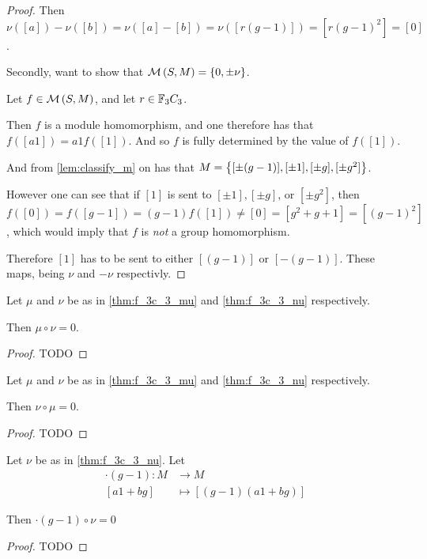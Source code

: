\begin{proof}
    Then \( \nu([a]) - \nu([b]) = \nu([a] - [b]) = \nu([r(g - 1)]) = [r(g - 1)^2] = [0] \).

    Secondly, want to show that \( {\mathcal{M}}\left( S, M \right) = \left\{ 0, \pm \nu \right\} \).

    Let \( f \in {\mathcal{M}}\left( S, M \right) \), and let \( r \in {\mathbb{F}}_3C_3 \).
    
    Then \( f \) is a module homomorphism, and one therefore has that \( f([a1]) = a1 f([1]) \). And so \( f \) is fully determined by the value of \( f([1]) \). 
    
    And from \autoref{lem:classify_m} on has that \( M = \left\{ [\pm (g - 1)], [\pm 1], [\pm g], [\pm g^2] \right\} \).

    However one can see that if \( [1] \) is sent to \( [\pm 1], [\pm g] \), or \( [\pm g^2] \), then \( f([0]) = f([g - 1]) = (g - 1)f([1]) \neq [0] = [g^2 + g + 1] = [(g - 1)^2] \), which would imply that \( f \) is \emph{not} a group homomorphism.

    Therefore \( [1] \) has to be sent to either \( [(g - 1)] \) or \( [-(g - 1)] \). These maps, being \( \nu \) and \( -\nu \) respectivly.
\end{proof}

\begin{lemma} \label{thm:f_3c_3_mu_circ_nu_zero}
    Let \( \mu \) and \( \nu \) be as in \autoref{thm:f_3c_3_mu} and \autoref{thm:f_3c_3_nu} respectively.

    Then \( \mu \circ \nu = 0 \).
\end{lemma}
\begin{proof}
    TODO
\end{proof}

\begin{lemma} \label{thm:f_3c_3_nu_circ_mu_zero}
    Let \( \mu \) and \( \nu \) be as in \autoref{thm:f_3c_3_mu} and \autoref{thm:f_3c_3_nu} respectively.

    Then \( \nu \circ \mu = 0 \).
\end{lemma}
\begin{proof}
    TODO
\end{proof}

\begin{lemma} \label{lem:g-1_circ_nu_equals_zero}
    Let \( \nu \) be as in \autoref{thm:f_3c_3_nu}. Let
    \begin{align*}
        \cdot(g - 1): M &\to M \\
        [a1 + bg] &\mapsto [(g - 1)(a1 + bg)]
    \end{align*}

    Then \( \cdot(g - 1) \circ \nu = 0 \) 
\end{lemma}
\begin{proof}
    TODO
\end{proof}

